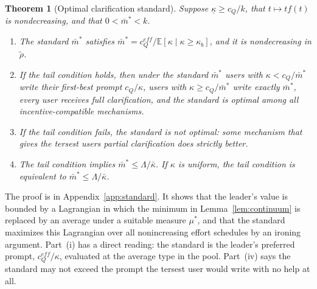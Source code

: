 \documentclass[11pt]{article}
\newtheorem{theorem}{Theorem}
\begin{document}
\begin{theorem}[Optimal clarification standard]
\label{thm:standard}
Suppose $\underline\kappa \ge c_Q/k$, that $t \mapsto t f(t)$ is nondecreasing, and that $0 < \bar m^* < k$.
\begin{enumerate}[label=(\roman*)]
\item The standard $\bar m^*$ satisfies $\bar m^* = c_Q^{eff} / \mathbb{E}[\kappa \mid \kappa \ge \kappa_b]$, and it is nondecreasing in $\tilde\rho$.
\item If the tail condition holds, then under the standard $\bar m^*$ users with $\kappa < c_Q/\bar m^*$ write their first-best prompt $c_Q/\kappa$, users with $\kappa \ge c_Q/\bar m^*$ write exactly $\bar m^*$, every user receives full clarification, and the standard is optimal among all incentive-compatible mechanisms.
\item If the tail condition fails, the standard is not optimal: some mechanism that gives the tersest users partial clarification does strictly better.
\item The tail condition implies $\bar m^* \le \Lambda/\bar\kappa$. If $\kappa$ is uniform, the tail condition is equivalent to $\bar m^* \le \Lambda/\bar\kappa$.
\end{enumerate}
\end{theorem}

The proof is in Appendix~\ref{app:standard}. It shows that the leader's value is bounded by a Lagrangian in which the minimum in Lemma~\ref{lem:continuum} is replaced by an average under a suitable measure $\mu^*$, and that the standard maximizes this Lagrangian over all nonincreasing effort schedules by an ironing argument. Part~(i) has a direct reading: the standard is the leader's preferred prompt, $c_Q^{eff}/\kappa$, evaluated at the average type in the pool. Part~(iv) says the standard may not exceed the prompt the tersest user would write with no help at all.
\end{document}
